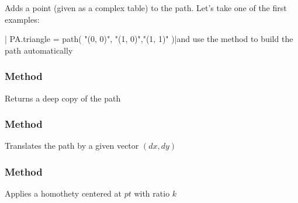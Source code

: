 Adds a point (given as a complex table) to the path. Let's take one of the first examples:

| PA.triangle = path({ "(0, 0)", "(1, 0)","(1, 1)" })|and use the method to build the path automatically

\begin{tkzexample}[latex=.3\textwidth]
\end{tkzexample}

\subsubsection{Method }
\label{ssub:method_tkzmeth_path_copy}

Returns a deep copy of the path

\begin{tkzexample}[latex=.3\textwidth]
\end{tkzexample}

\subsubsection{Method }
\label{ssub:method_tkzmeth_path_translate}

Translates the path by a given vector \((dx,dy)\)

\begin{tkzexample}[latex=.3\textwidth]
\end{tkzexample}

\subsubsection{Method }
\label{ssub:method_tkzmeth_path_homothety}

Applies a homothety centered at \(pt\) with ratio \(k\)


